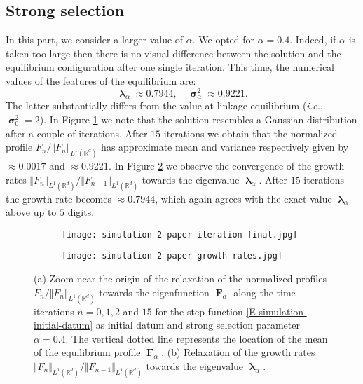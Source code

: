 \documentclass[reqno]{amsart}
\DeclareMathOperator{\blambda}{\boldsymbol{\lambda}}
\DeclareMathOperator{\bsigma}{\boldsymbol{\sigma}}
\DeclareMathOperator{\bF}{\boldsymbol{F}}
\numberwithin{equation}{section}
\begin{document}
{\subsection{Strong selection} In this part, we consider a larger value of $\alpha$. We opted for $\alpha=0.4$. Indeed, if $\alpha$ is taken too large then there is no visual difference between the solution and the equilibrium configuration after one single iteration. 
This time, the numerical values of the features of the equilibrium are:
$$\blambda_\alpha\approx 0.7944,\quad \bsigma_\alpha^2\approx 0.9221.$$
The latter substantially differs from the value at linkage equilibrium ({\em i.e.}, $\bsigma_0^2 = 2$). In Figure \ref{fig:simulation-2-profiles} we note that the solution resembles a Gaussian distribution after a couple of iterations. After $15$ iterations we obtain that the normalized profile $F_n/\Vert F_n\Vert_{L^1(\mathbb{R}^d)}$ has approximate mean and variance respectively given by $\approx 0.0017$ and $\approx 0.9221$. In Figure \ref{fig:simulation-2-mass} we observe the convergence of the growth rates $\Vert F_n\Vert_{L^1(\mathbb{R}^d)}/\Vert F_{n-1}\Vert_{L^1(\mathbb{R}^d)}$ towards the eigenvalue $\blambda_\alpha$. After $15$ iterations the growth rate becomes $\approx 0.7944$, which again agrees with the exact value $\blambda_\alpha$ above up to $5$ digits.

\begin{figure}
\centering
\begin{subfigure}[t]{0.49\textwidth}
\centering
\texttt{[image: simulation-2-paper-iteration-final.jpg]}
\caption{ }
\label{fig:simulation-2-profiles}
\end{subfigure}
\begin{subfigure}[t]{0.49\textwidth}
\centering
\texttt{[image: simulation-2-paper-growth-rates.jpg]}
\caption{ }
\label{fig:simulation-2-mass}
\end{subfigure}
\caption{(a) Zoom near the origin of the relaxation of the normalized profiles $F_n/\Vert F_n\Vert_{L^1(\mathbb{R}^d)}$ towards the eigenfunction $\bF_\alpha$ along the time iterations $n=0,1,2$ and $15$ for the step function \eqref{E-simulation-initial-datum} as initial datum and strong selection parameter $\alpha=0.4$. The vertical dotted line represents the location of the mean of the equilibrium profile $\bF_\alpha$. (b) Relaxation of the growth rates $\Vert F_n\Vert_{L^1(\mathbb{R}^d)}/\Vert F_{n-1}\Vert_{L^1(\mathbb{R}^d)}$ towards the eigenvalue $\blambda_\alpha$.}
\label{fig:simulation-2-profiles-mass}
\end{figure}

}
\end{document}
